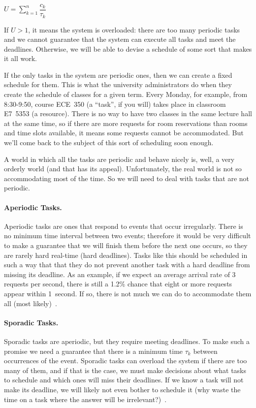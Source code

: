 \begin{center}
$U = \sum\limits_{k=1}^n\dfrac{c_{k}}{\tau_{k}}$
\end{center}

If $U > 1$, it means the system is overloaded: there are too many periodic tasks and we cannot guarantee that the system can execute all tasks and meet the deadlines. Otherwise, we will be able to devise a schedule of some sort that makes it all work.

If the only tasks in the system are periodic ones, then we can create a fixed schedule for them. This is what the university administrators do when they create the schedule of classes for a given term. Every Monday, for example, from 8:30-9:50, course ECE~350 (a ``task'', if you will) takes place in classroom E7~5353 (a resource). There is no way to have two classes in the same lecture hall at the same time, so if there are more requests for room reservations than rooms and time slots available, it means some requests cannot be accommodated. But we'll come back to the subject of this sort of scheduling soon enough.

A world in which all the tasks are periodic and behave nicely is, well, a very orderly world (and that has its appeal). Unfortunately, the real world is not so accommodating most of the time. So we will need to deal with tasks that are not periodic.

\paragraph{Aperiodic Tasks.}
Aperiodic tasks are ones that respond to events that occur irregularly. There is no minimum time interval between two events; therefore it would be very difficult to make a guarantee that we will finish them before the next one occurs, so they are rarely hard real-time (hard deadlines). Tasks like this should be scheduled in such a way that that they do not prevent another task with a hard deadline from missing its deadline. As an example, if we expect an average arrival rate of 3 requests per second, there is still a 1.2\% chance that eight or more requests appear within 1~second. If so, there is not much we can do to accommodate them all (most likely)~\cite{mte241}.

\paragraph{Sporadic Tasks.}
Sporadic tasks are aperiodic, but they require meeting deadlines. To make such a promise we need a guarantee that there is a minimum time $\tau_{k}$ between occurrences of the event. Sporadic tasks can overload the system if there are too many of them, and if that is the case, we must make decisions about what tasks to schedule and which ones will miss their deadlines. If we know a task will not make its deadline, we will likely not even bother to schedule it (why waste the time on a task where the answer will be irrelevant?)~\cite{mte241}.

